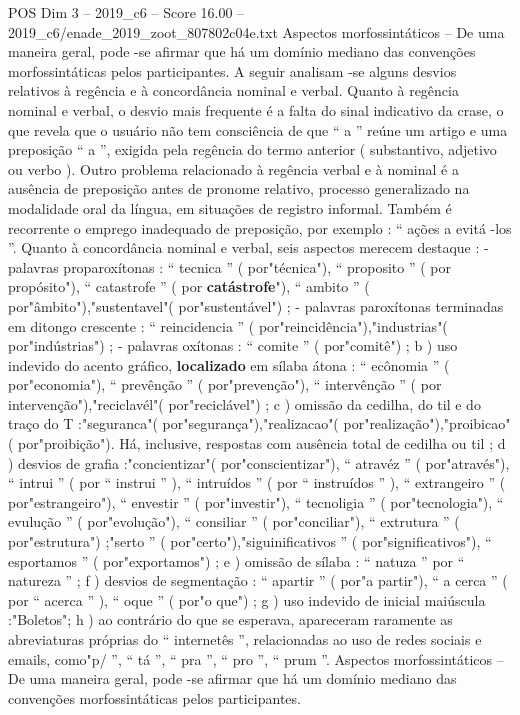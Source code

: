 \begin{textsample}{POS Dim 3 – 2019\_c6 – Score 16.00 – 2019\_c6/enade\_2019\_zoot\_807802c04e.txt}
Aspectos morfossintáticos – De uma maneira geral, pode -se afirmar que há um domínio mediano das convenções morfossintáticas pelos participantes.
A seguir analisam -se alguns desvios relativos à regência e à concordância nominal e verbal.
Quanto à regência nominal e verbal, o desvio mais frequente é a falta do sinal indicativo da crase, o que revela que o usuário não tem consciência de que “ a ” reúne um artigo e uma preposição “ a ”, exigida pela regência do termo anterior ( substantivo, adjetivo ou verbo ).
Outro problema relacionado à regência verbal e à nominal é a ausência de preposição antes de pronome relativo, processo generalizado na modalidade oral da língua, em situações de registro informal.
Também é recorrente o emprego inadequado de preposição, por exemplo : “ ações a evitá -los ”.
Quanto à concordância nominal e verbal, seis aspectos merecem destaque : - palavras proparoxítonas : “ tecnica ” ( por"técnica"), “ proposito ” ( por propósito"), “ catastrofe ” ( por \textbf{catástrofe}"), “ ambito ” ( por"âmbito"),"sustentavel"( por"sustentável") ; - palavras paroxítonas terminadas em ditongo crescente : “ reincidencia ” ( por"reincidência"),"industrias"( por"indústrias") ; - palavras oxítonas : “ comite ” ( por"comitê") ; b ) uso indevido do acento gráfico, \textbf{localizado} em sílaba átona : “ ecônomia ” ( por"economia"), “ prevênção ” ( por"prevenção"), “ intervênção ” ( por intervenção"),"reciclavél"( por"reciclável") ; c ) omissão da cedilha, do til e do traço do T :"seguranca"( por"segurança"),"realizacao"( por"realização"),"proibicao"( por"proibição").
Há, inclusive, respostas com ausência total de cedilha ou til ; d ) desvios de grafia :"concientizar"( por"conscientizar"), “ atravéz ” ( por"através"), “ intrui ” ( por “ instrui ” ), “ intruídos ” ( por “ instruídos ” ), “ extrangeiro ” ( por"estrangeiro"), “ envestir ” ( por"investir"), “ tecnoligia ” ( por"tecnologia"), “ evulução ” ( por"evolução"), “ consiliar ” ( por"conciliar"), “ extrutura ” ( por"estrutura") ;"serto ” ( por"certo"),"siguinificativos ” ( por"significativos"), “ esportamos ” ( por"exportamos") ; e ) omissão de sílaba : “ natuza ” por “ natureza ” ; f ) desvios de segmentação : “ apartir ” ( por"a partir"), “ a cerca ” ( por “ acerca ” ), “ oque ” ( por"o que") ; g ) uso indevido de inicial maiúscula :"Boletos"; h ) ao contrário do que se esperava, apareceram raramente as abreviaturas próprias do “ internetês ”, relacionadas ao uso de redes sociais e emails, como"p/ ”, “ tá ”, “ pra ”, “ pro ”, “ prum ”.
Aspectos morfossintáticos – De uma maneira geral, pode -se afirmar que há um domínio mediano das convenções morfossintáticas pelos participantes.

\end{textsample}
